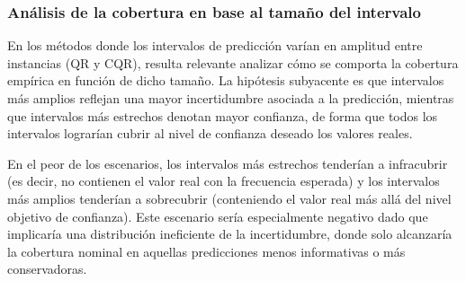 \subsubsection{Análisis de la cobertura en base al tamaño del intervalo}

En los métodos donde los intervalos de predicción varían en amplitud entre instancias (QR y CQR), resulta relevante analizar cómo se comporta la cobertura empírica en función de dicho tamaño. La hipótesis subyacente es que intervalos más amplios reflejan una mayor incertidumbre asociada a la predicción, mientras que intervalos más estrechos denotan mayor confianza, de forma que todos los intervalos lograrían cubrir al nivel de confianza deseado los valores reales. 

En el peor de los escenarios, los intervalos más estrechos tenderían a infracubrir (es decir, no contienen el valor real con la frecuencia esperada) y los intervalos más amplios tenderían a sobrecubrir (conteniendo el valor real más allá del nivel objetivo de confianza). Este escenario sería especialmente negativo dado que implicaría una distribución ineficiente de la incertidumbre, donde solo alcanzaría la cobertura nominal en aquellas predicciones menos informativas o más conservadoras.

